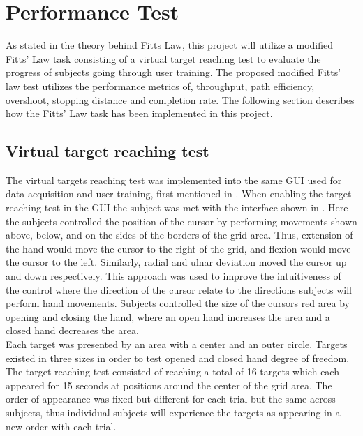 \section{Performance Test} \label{sec:M:fittsLaw}


As stated in  the theory behind Fitts Law, this project will utilize a modified Fitts' Law task consisting of a virtual target reaching test to evaluate the progress of subjects going through user training. The proposed modified Fitts' law test utilizes the performance metrics of, throughput, path efficiency, overshoot, stopping distance and completion rate. The following section describes how the Fitts' Law task has been implemented in this project.

\subsection{Virtual target reaching test} \label{sub:M:targetReachingTest}

The virtual targets reaching test was implemented into the same GUI used for data acquisition and user training, first mentioned in . 
When enabling the target reaching test in the GUI the subject was met with the interface shown in . Here the subjects controlled the position of the cursor by performing movements shown above, below, and on the sides of the borders of the grid area. Thus, extension of the hand would move the cursor to the right of the grid, and flexion would move the cursor to the left. Similarly, radial and ulnar deviation moved the cursor up and down respectively. This approach was used to improve the intuitiveness of the control where the direction of the cursor relate to the directions subjects will perform hand movements.
Subjects controlled the size of the cursors red area by opening and closing the hand, where an open hand increases the area and a closed hand decreases the area. \\
Each target was presented by an area with a center and an outer circle. Targets existed in three sizes in order to test opened and closed hand degree of freedom. The target reaching test consisted of reaching a total of 16 targets which each appeared for 15 seconds at positions around the center of the grid area. The order of appearance was fixed but different for each trial but the same across subjects, thus individual subjects will experience the targets as appearing in a new order with each trial. 

